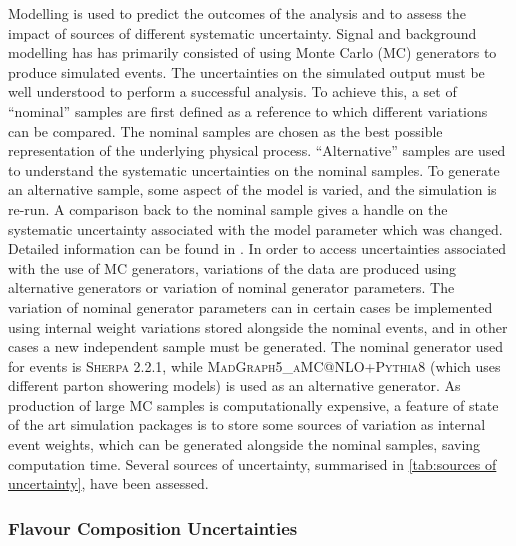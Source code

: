 Modelling is used to predict the outcomes of the analysis and to assess the impact of sources of different systematic uncertainty.
Signal and background modelling has has primarily consisted of using Monte Carlo (MC) generators to produce simulated events.
The uncertainties on the simulated output must be well understood to perform a successful analysis.
To achieve this, a set of ``nominal'' samples are first defined as a reference to which different variations can be compared.
The nominal samples are chosen as the best possible representation of the underlying physical process. ``Alternative'' samples are used to understand the systematic uncertainties on the nominal samples.
To generate an alternative sample, some aspect of the model is varied, and the simulation is re-run.
A comparison back to the nominal sample gives a handle on the systematic uncertainty associated with the model parameter which was changed.
Detailed information can be found in \cite{Bell:2316951}.
In order to access uncertainties associated with the use of MC generators, variations of the data are produced using alternative generators or variation of nominal generator parameters.
The variation of nominal generator parameters can in certain cases be implemented using internal weight variations stored alongside the nominal events, and in other cases a new independent sample must be generated. The nominal generator used for \Vjets events is \textsc{Sherpa 2.2.1}, while \textsc{MadGraph5\_aMC@NLO+Pythia8} (which uses different parton showering models) is used as an alternative generator.
As production of large MC samples is computationally expensive, a feature of state of the art simulation packages is to store some sources of variation as internal event weights, which can be generated alongside the nominal samples, saving computation time. Several sources of uncertainty, summarised in \cref{tab:sources of uncertainty}, have been assessed.

%

%


\subsubsection{Flavour Composition Uncertainties}

